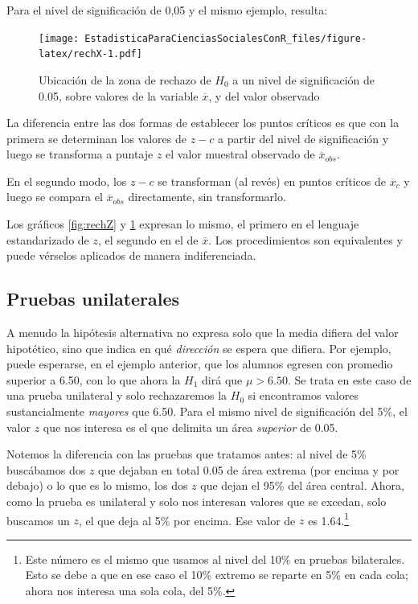 \documentclass[]{book}
\let\rmarkdownfootnote\footnote%
\def\footnote{\protect\rmarkdownfootnote}
\begin{document}
Para el nivel de significación de 0,05 y el mismo ejemplo, resulta:

\begin{figure}
\centering
\texttt{[image: EstadisticaParaCienciasSocialesConR\_files/figure-latex/rechX-1.pdf]}
\caption{\label{fig:rechX}Ubicación de la zona de rechazo de \(H_{0}\) a un nivel de significación de 0.05, sobre valores de la variable \(\overline{x}\), y del valor observado}
\end{figure}

La diferencia entre las dos formas de establecer los puntos críticos es
que con la primera se determinan los valores de \(z-{c}\) a partir del
nivel de significación y luego se transforma a puntaje \(z\) el valor
muestral observado de \({\overline{x}}_{obs}\).

En el segundo modo, los \(z-{c}\) se transforman (al revés) en puntos críticos de \({\overline{x}}_{c}\) y luego se compara el \({\overline{x}}_{obs}\) directamente, sin transformarlo.

Los gráficos \ref{fig:rechZ} y \ref{fig:rechX} expresan lo mismo, el primero en el lenguaje estandarizado de \(z\), el segundo en el de \(\overline{x}\). Los procedimientos son equivalentes y puede vérselos aplicados de manera indiferenciada.

\hypertarget{pruebas-unilaterales}{%
\subsection{Pruebas unilaterales}\label{pruebas-unilaterales}}

A menudo la hipótesis alternativa no expresa solo que la media difiera
del valor hipotético, sino que indica en qué \emph{dirección} se espera que
difiera. Por ejemplo, puede esperarse, en el ejemplo anterior, que los
alumnos egresen con promedio superior a 6.50, con lo que ahora la \(H_{1}\) dirá que \(\mu > 6.50\). Se trata en este caso de una prueba unilateral y solo rechazaremos la \(H_{0}\) si encontramos valores sustancialmente \emph{mayores} que 6.50. Para el mismo nivel de significación del 5\%, el valor \(z\) que nos interesa es el que delimita un área \emph{superior} de 0.05.

Notemos la diferencia con las pruebas que tratamos antes: al nivel de 5\% buscábamos dos \(z\) que dejaban en total 0.05 de área extrema (por encima y por debajo) o lo que es lo mismo, los dos \(z\) que dejan el 95\% del área central. Ahora, como la prueba es unilateral y solo nos interesan valores que se excedan, solo buscamos un \(z\), el que deja al 5\% por encima. Ese valor de \(z\) es 1.64.\footnote{Este número es el mismo que usamos al nivel del 10\% en pruebas bilaterales. Esto se debe a que en ese caso el 10\% extremo se reparte en 5\% en cada cola; ahora nos interesa una sola cola, del 5\%.}
\end{document}
